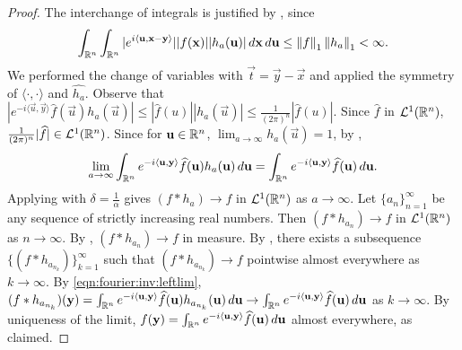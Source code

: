 \begin{proof}
The interchange of integrals is justified by , since \[\int_{{\mathbb R}^n}\int_{{\mathbb R}^n} |e^{i \langle \mathbf{u}, \mathbf{x} - \mathbf{y} \rangle}  | |f (\mathbf{x}) | |h_a (\mathbf{u})|  \,d\mathbf{x}  \,d\mathbf{u} \leq \left\lVert f\right\rVert_1 \left\lVert h_a\right\rVert_1 < \infty.\]
We performed the change of variables with $\vec{t} = \vec{y} - \vec{x}$ and applied the symmetry of $\langle \cdot, \cdot \rangle$ and $\widehat{h_a}$. Observe that $|e^{-i \langle \vec{u}, \vec{y} \rangle} \widehat{f}(\vec{u}) h_a(\vec{u})| \leq |\widehat{f}(u)||h_a(\vec{u})| \leq \frac{1}{(2 \pi)^n} |\widehat{f}(u)|$. Since $\widehat{f}$ in ${\mathcal {L}^1}({\mathbb R}^n)$, $ \frac{1}{(2 \pi)^n} |\widehat{f}| \in {\mathcal {L}^1}({\mathbb R}^n)$. Since for $\mathbf{u} \in {\mathbb R}^n$, $\lim_{a \to \infty} h_a (\vec{u}) = 1$, by , \begin{equation}
    \label{eqn:fourier:inv:leftlim}
    \lim_{a \to \infty} \int_{{\mathbb R}^n}  e^{-i \langle \mathbf{u}, \mathbf{y}\rangle} \widehat{f}(\mathbf{u})  h_a(\mathbf{u}) \,d\mathbf{u}  =  \int_{{\mathbb R}^n}  e^{-i \langle \mathbf{u}, \mathbf{y}\rangle} \widehat{f}(\mathbf{u})   \,d\mathbf{u}.
\end{equation}
Applying  with $\delta = \frac{1}{\alpha}$ gives $(f \ast h_a) \to f$ in ${\mathcal {L}^1}({\mathbb R}^n)$ as $a \to \infty$. Let $\{ a_n \}_{n =1}^\infty$ be any sequence of strictly increasing real numbers. Then $(f \ast h_{a_n}) \to f$ in ${\mathcal {L}^1}({\mathbb R}^n)$ as $n \to \infty$. By , $(f \ast h_{a_n}) \to f$ in measure. By , there exists a subsequence $\{(f \ast h_ {a_{n_k}})\}_{k=1}^\infty$ such that $(f \ast h_ {a_{n_k}}) \to f$ pointwise almost everywhere as $k \to \infty$. By \ref{eqn:fourier:inv:leftlim}, $(f \ast h_ {a_{n_k}})(\mathbf{y}) = \int_{{\mathbb R}^n}  e^{-i \langle \mathbf{u}, \mathbf{y}\rangle} \widehat{f}(\mathbf{u})  h_{a_{n_k}}(\mathbf{u}) \,d\mathbf{u} \to  \int_{{\mathbb R}^n}  e^{-i \langle \mathbf{u}, \mathbf{y}\rangle} \widehat{f}(\mathbf{u}) \,d\mathbf{u}$ as $k \to \infty$. By uniqueness of the limit, $f(\mathbf{y}) = \int_{{\mathbb R}^n}  e^{-i \langle \mathbf{u}, \mathbf{y}\rangle} \widehat{f}(\mathbf{u}) \,d\mathbf{u}$ almost everywhere, as claimed.
\end{proof}